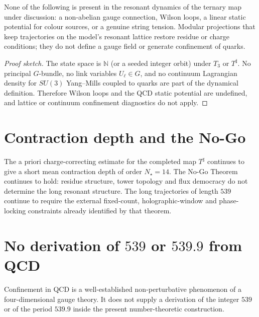\begin{theorem}
\label{thm:no-qcd-in-map}
None of the following is present in the resonant dynamics of the ternary map
under discussion: a non-abelian gauge connection, Wilson loops, a linear static
potential for colour sources, or a genuine string tension. Modular projections
that keep trajectories on the model's resonant lattice restore residue or charge
conditions; they do not define a gauge field or generate confinement of quarks.
\end{theorem}

\begin{proof}[Proof sketch]
The state space is \(\mathbb{N}\) (or a seeded integer orbit) under \(T_3\) or
\(T^\sharp\). No principal \(G\)-bundle, no link variables \(U_\ell\in G\), and
no continuum Lagrangian density for \(SU(3)\) Yang--Mills coupled to quarks are
part of the dynamical definition. Therefore Wilson loops and the QCD static
potential are undefined, and lattice or continuum confinement diagnostics do
not apply.
\end{proof}

\section{Contraction depth and the No-Go}

The a priori charge-correcting estimate for the completed map \(T^\sharp\)
continues to give a short mean contraction depth of order
\(N_\star=14\). The No-Go Theorem continues to hold: residue structure, tower
topology and flux democracy do not determine the long resonant structure. The
long trajectories of length \(539\) continue to require the external
fixed-count, holographic-window and phase-locking constraints already
identified by that theorem.

\section{No derivation of \(539\) or \(539.9\) from QCD}

\begin{theorem}
\label{thm:qcd-not-539}
Confinement in QCD is a well-established non-perturbative phenomenon of a
four-dimensional gauge theory. It does not supply a derivation of the integer
\(539\) or of the period \(539.9\) inside the present number-theoretic
construction.
\end{theorem}

